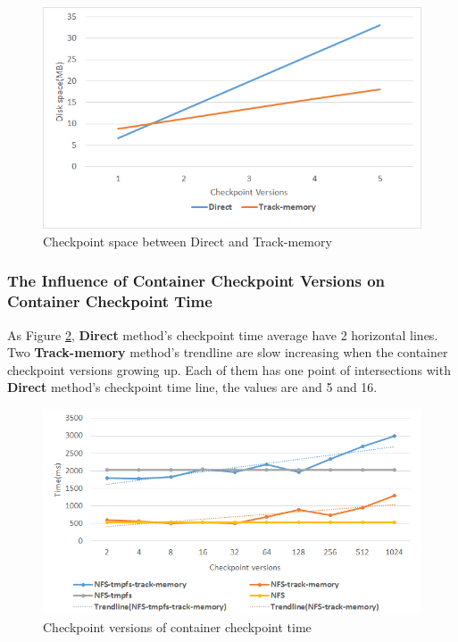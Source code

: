 \begin{figure}[htbp]
\begin{center}
\includegraphics[width=14cm]{figure/version_space.png}
\end{center}
\caption{Checkpoint space between Direct and Track-memory}
\label{fig:vsersion space}
\end{figure}

\subsubsection{The Influence of Container Checkpoint Versions on Container Checkpoint Time}
As Figure \ref{fig:versions}, \textbf{Direct} method's checkpoint time average have 2 horizontal lines.
Two \textbf{Track-memory} method's trendline are slow increasing when the container checkpoint versions growing up.
Each of them has one point of intersections with \textbf{Direct} method's checkpoint time line, the values are and 5 and 16.

\begin{figure}[htbp]
\begin{center}
\includegraphics[width=14cm]{figure/versions.png}
\end{center}
\caption{Checkpoint versions of container checkpoint time}
\label{fig:versions}
\end{figure}

